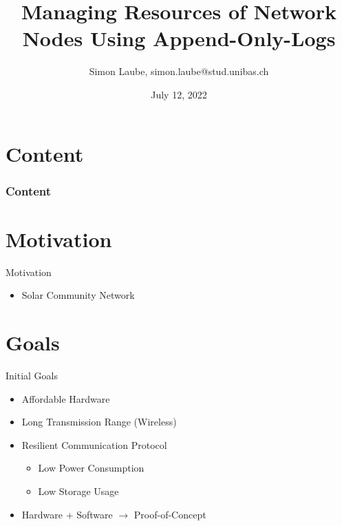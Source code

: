 \documentclass[aspectratio=169]{beamer}
\title              {Managing Resources of Network Nodes Using Append-Only-Logs}
\author             {Simon Laube, simon.laube@stud.unibas.ch}
\institute          {Advisor: Prof. Dr. Christian Tschudin, 
                    Supervisor: Fabrizio Parrillo}
\date               {July 12, 2022}
\begin{document}

\begin{frame}[t,plain]
\titlepage
\end{frame}


\section*{Content}	

\begin{frame}
\frametitle{Content} 
\tableofcontents
\end{frame}


\section{Motivation}

\begin{frame}[c]{Motivation}
\begin{itemize}
    \item Solar Community Network
\end{itemize}        
\end{frame}

\section{Goals}

\begin{frame}[c]{Initial Goals}
\begin{itemize}
    \item Affordable Hardware
    \item Long Transmission Range (Wireless)
    \item Resilient Communication Protocol
    \begin{itemize}
    	\item Low Power Consumption
    	\item Low Storage Usage
    \end{itemize}
    \item Hardware + Software $\rightarrow$ Proof-of-Concept
    
\end{itemize}        
\end{frame}
\end{document}
